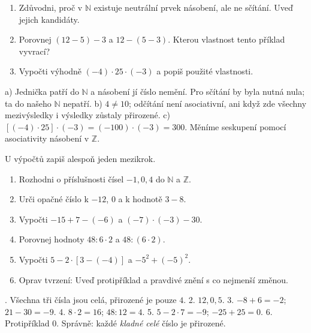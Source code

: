 \documentclass[11pt,a4paper]{article}
\begin{document}

\begin{zadaniReseniBox}[title={Rozšíření 2},breakable=false]
\begin{enumerate}[label=\alph*)]
\item Zdůvodni, proč v $\mathbb N$ existuje neutrální prvek násobení,
ale ne sčítání. Uveď jejich kandidáty.
\item Porovnej $(12-5)-3$ a $12-(5-3)$. Kterou vlastnost tento příklad vyvrací?
\item Vypočti výhodně $(-4)\cdot25\cdot(-3)$ a popiš použité vlastnosti.
\end{enumerate}
\tcblower
a) Jednička patří do $\mathbb N$ a násobení jí číslo nemění.
Pro sčítání by byla nutná nula; ta do našeho $\mathbb N$ nepatří.
b) $4\ne10$; odčítání není asociativní, ani když zde všechny mezivýsledky
i výsledky zůstaly přirozené.
c) $[(-4)\cdot25]\cdot(-3)=(-100)\cdot(-3)=300$.
Měníme seskupení pomocí asociativity násobení v $\mathbb Z$.
\end{zadaniReseniBox}


\begin{zadaniReseniBox}[title={Domácí úkol},breakable=false]
U výpočtů zapiš alespoň jeden mezikrok.
\begin{enumerate}[label=\arabic*)]
\item Rozhodni o příslušnosti čísel $-1,0,4$ do $\mathbb N$ a $\mathbb Z$.
\item Urči opačné číslo k $-12$, $0$ a k hodnotě $3-8$.
\item Vypočti $-15+7-(-6)$ a $(-7)\cdot(-3)-30$.
\item Porovnej hodnoty $48:6\cdot2$ a $48:(6\cdot2)$.
\item Vypočti $5-2\cdot[3-(-4)]$ a $-5^2+(-5)^2$.
\item Oprav tvrzení: 
Uveď protipříklad a pravdivé znění s co nejmenší změnou.
\end{enumerate}
. Všechna tři čísla jsou celá, přirozené je pouze $4$.
2. $12,0,5$.
3. $-8+6=-2$; $21-30=-9$.
4. $8\cdot2=16$; $48:12=4$.
5. $5-2\cdot7=-9$; $-25+25=0$.
6. Protipříklad $0$. Správně: každé \emph{kladné celé} číslo je přirozené.
\end{zadaniReseniBox}
\end{document}
